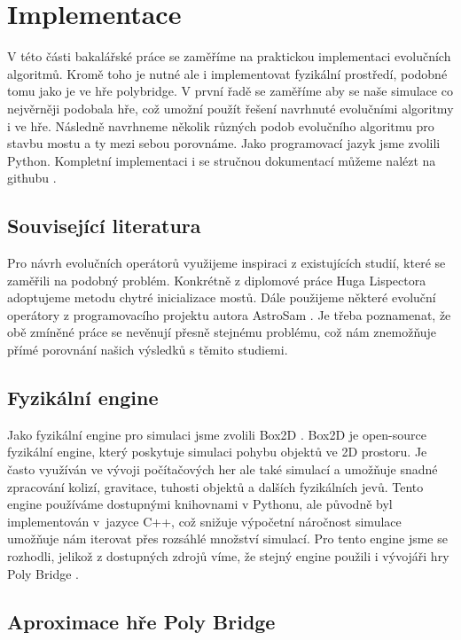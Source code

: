 \chapter{Implementace}

V této části bakalářské práce se zaměříme na praktickou implementaci evolučních algoritmů. Kromě toho je nutné ale i implementovat fyzikální prostředí, podobné tomu jako je ve hře polybridge. V první řadě se zaměříme aby se naše simulace co nejvěrněji podobala hře, což umožní použít řešení navrhnuté evolučními algoritmy i ve hře. Následně navrhneme několik různých podob evolučního algoritmu pro stavbu mostu a ty mezi sebou porovnáme. Jako programovací jazyk jsme zvolili Python. Kompletní implementaci i se stručnou dokumentací můžeme nalézt na githubu \cite{git}.

\section{Související literatura}

Pro návrh evolučních operátorů využijeme inspiraci z existujících studií, které se zaměřili na podobný problém. Konkrétně z diplomové práce Huga Lispectora \cite{Lispector2022} adoptujeme metodu chytré inicializace mostů. Dále použijeme některé evoluční operátory z programovacího projektu autora AstroSam \cite{AstroSam2023}. Je třeba poznamenat, že obě zmíněné práce se nevěnují přesně stejnému problému, což nám znemožňuje přímé porovnání našich výsledků s těmito studiemi.

\section{Fyzikální engine}

Jako fyzikální engine pro simulaci jsme zvolili Box2D \cite{box2d}. Box2D je open-source fyzikální engine, který poskytuje simulaci pohybu objektů ve 2D prostoru. Je často využíván ve vývoji počítačových her ale také simulací a umožňuje snadné zpracování kolizí, gravitace, tuhosti objektů a dalších fyzikálních jevů. Tento engine používáme dostupnými knihovnami v Pythonu, ale původně byl implementován v~jazyce C++, což snižuje výpočetní náročnost simulace umožňuje nám iterovat přes rozsáhlé množství simulací. Pro tento engine jsme se rozhodli, jelikož z dostupných zdrojů víme, že stejný engine použili i vývojáři hry Poly Bridge \cite{Reddit}. 

\section{Aproximace hře Poly Bridge}

